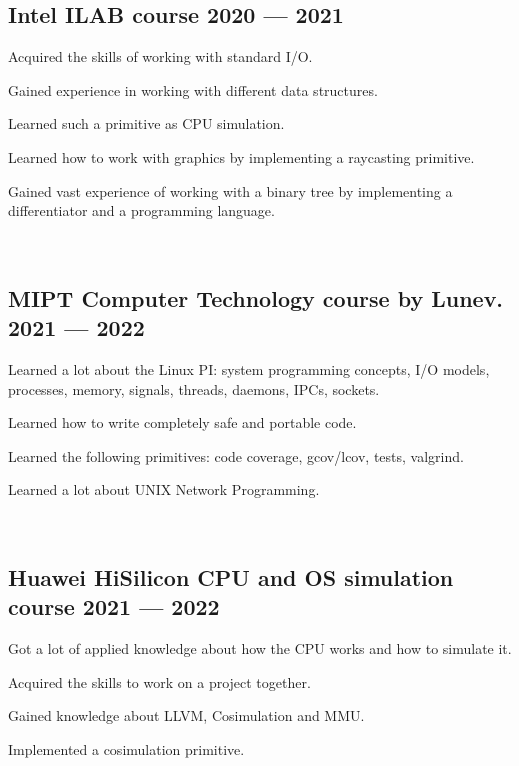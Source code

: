\subsection{{Intel ILAB course  \hfill 2020 --- 2021}}

\begin{zitemize}
\item Acquired the skills of working with standard I/O.
\item Gained experience in working with different data structures.
\item Learned such a primitive as CPU simulation.
\item Learned how to work with graphics by implementing a raycasting primitive.
\item Gained vast experience of working with a binary tree by implementing a differentiator and a programming language.
\end{zitemize}

\

\subsection{{MIPT Computer Technology course by Lunev. \hfill 2021 --- 2022}}

\begin{zitemize}
\item Learned a lot about the Linux PI: system programming concepts, I/O models, processes, memory, signals, threads, daemons, IPCs, sockets.
\item Learned how to write completely safe and portable code.
\item Learned the following primitives: code coverage, gcov/lcov, tests, valgrind.
\item Learned a lot about UNIX Network Programming.
\end{zitemize}

\

\subsection{{Huawei HiSilicon CPU and OS simulation course \hfill 2021 --- 2022}}

\begin{zitemize}
\item Got a lot of applied knowledge about how the CPU works and how to simulate it.
\item Acquired the skills to work on a project together.
\item Gained knowledge about LLVM, Cosimulation and MMU.
\item Implemented a cosimulation primitive.
\end{zitemize}

